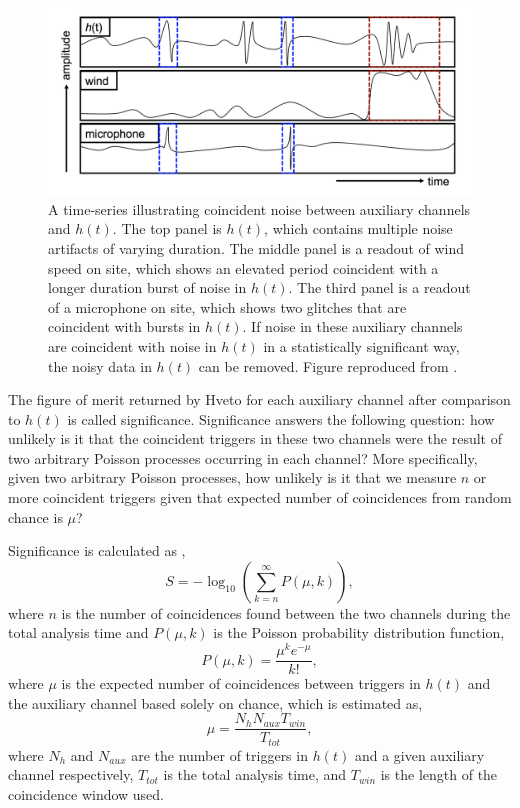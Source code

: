 \begin{figure}[ht!]
\includegraphics[width=\textwidth]{figures/detchar/hveto_example}
\caption[Example of coincident noise]{A time-series illustrating coincident noise %
         between auxiliary channels and $h(t)$. The top panel is $h(t)$, which contains %
         multiple noise artifacts of varying duration. The middle panel is a readout of %
         wind speed on site, which shows an elevated period coincident with a longer duration %
         burst of noise in $h(t)$. The third panel is a readout of a microphone on site, %
         which shows two glitches that are coincident with bursts in $h(t)$. If noise in %
         these auxiliary channels are coincident with noise in $h(t)$ in a statistically %
         significant way, the noisy data in $h(t)$ can be removed. Figure reproduced from %
         \cite{Smith:2011}.
         }
\label{fig:hveto-aux}
\end{figure}

The figure of merit returned by Hveto for each auxiliary channel 
after comparison to $h(t)$ is called significance.
Significance answers the following question: how unlikely is it that 
the coincident triggers in these two channels were the result of 
two arbitrary Poisson processes occurring in each channel? 
More specifically, given two arbitrary Poisson processes, how 
unlikely is it that we measure $n$ or more coincident triggers 
given that expected number of coincidences from random chance is $\mu$?

Significance is calculated as \cite{Smith:2011},
\begin{equation}
S = -\log_{10} (\sum\limits_{k = n}^{\infty} P(\mu,k)),
\end{equation}
where $n$ is the number of coincidences found between the two channels 
during the total analysis time and $P(\mu,k)$ is the Poisson probability 
distribution function,
\begin{equation}
P(\mu,k) = \frac{\mu^{k}e^{-\mu}}{k!},
\end{equation}
where $\mu$ is the expected number of coincidences between triggers in 
$h(t)$ and the auxiliary channel based solely on chance, which is estimated as,
\begin{equation}
\mu = \frac{N_{h}N_{aux}T_{win}}{T_{tot}},
\end{equation}
where $N_{h}$ and $N_{aux}$ are the number of triggers in $h(t)$ and a 
given auxiliary channel respectively, 
$T_{tot}$ is the total analysis time, and $T_{win}$ is the length of the 
coincidence window used.

